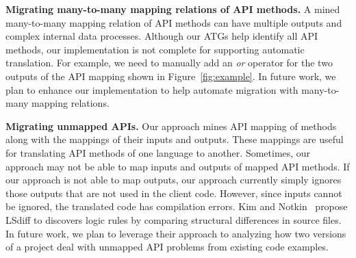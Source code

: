 
\textbf{Migrating many-to-many mapping relations of API methods.}
A mined many-to-many mapping relation of API methods can have multiple outputs
and complex internal data processes. Although our ATGs
help identify all API methods, our implementation is not complete
for supporting automatic translation. For example, we need to manually add an
\emph{or} operator for the two outputs of the API mapping shown in
Figure~\ref{fig:example}. In future work, we plan to enhance our implementation to help
automate migration with many-to-many mapping relations.

\textbf{Migrating unmapped APIs.} Our approach mines API mapping of
methods along with the mappings of their inputs and outputs. These
mappings are useful for translating API methods of one language to
another. Sometimes, our approach may not be able to map inputs and
outputs of mapped API methods. If our approach is not able to map
outputs, our approach currently simply ignores those outputs that are not used
in the client code. However, since inputs cannot be ignored, the
translated code has compilation errors. Kim and Notkin~\cite{kim2009discovering} propose LSdiff to discovers logic rules by comparing structural differences in source files.
In future work, we plan to leverage their approach to analyzing how two versions of a
project deal with unmapped API problems from existing code
examples.
